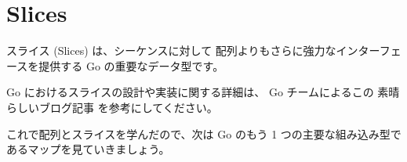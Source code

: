 \section{Slices}

スライス (Slices) は、シーケンスに対して 配列よりもさらに強力なインターフェースを提供する Go の重要なデータ型です。




Go におけるスライスの設計や実装に関する詳細は、 Go チームによるこの 素晴らしいブログ記事 を参考にしてください。

これで配列とスライスを学んだので、次は Go のもう 1 つの主要な組み込み型であるマップを見ていきましょう。